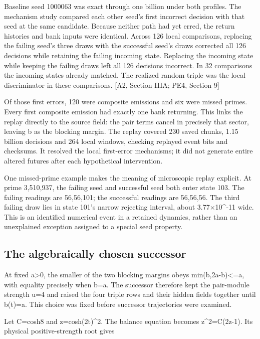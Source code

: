Baseline seed 1000063 was exact through one billion under both profiles. The mechanism study compared each other seed's first incorrect decision with that seed at the same candidate. Because neither path had yet erred, the return histories and bank inputs were identical. Across 126 local comparisons, replacing the failing seed's three draws with the successful seed's draws corrected all 126 decisions while retaining the failing incoming state. Replacing the incoming state while keeping the failing draws left all 126 decisions incorrect. In 32 comparisons the incoming states already matched. The realized random triple was the local discriminator in these comparisons. {[}A2, Section IIIA; PE4, Section 9{]}

Of those first errors, 120 were composite emissions and six were missed primes. Every first composite emission had exactly one bank returning. This links the replay directly to the source field: the pair terms cancel in precisely that sector, leaving b as the blocking margin. The replay covered 230 saved chunks, 1.15 billion decisions and 264 local windows, checking replayed event bits and checksums. It resolved the local first-error mechanisms; it did not generate entire altered futures after each hypothetical intervention.

One missed-prime example makes the meaning of microscopic replay explicit. At prime 3,510,937, the failing seed and successful seed both enter state 103. The failing readings are 56,56,101; the successful readings are 56,56,56. The third failing draw lies in state 101's narrow rejecting interval, about 3.77×10\^{}-11 wide. This is an identified numerical event in a retained dynamics, rather than an unexplained exception assigned to a special seed property.

\subsection{The algebraically chosen successor}\label{the-algebraically-chosen-successor}

At fixed a\textgreater0, the smaller of the two blocking margins obeys min(b,2a-b)\textless=a, with equality precisely when b=a. The successor therefore kept the pair-module strength u=4 and raised the four triple rows and their hidden fields together until b(t)=a. This choice was fixed before successor trajectories were examined.

Let C=cosh8 and z=cosh(2t)\^{}2. The balance equation becomes z\^{}2=C(2z-1). Its physical positive-strength root gives

